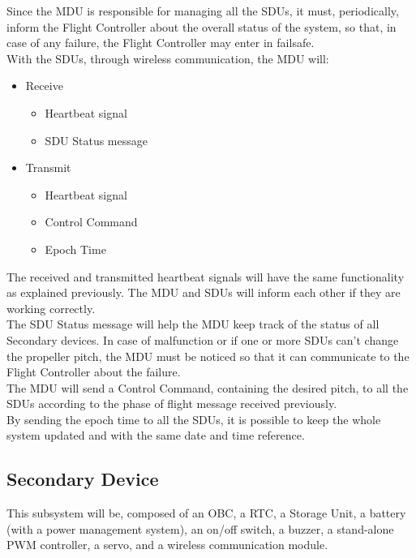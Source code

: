 Since the MDU is responsible for managing all the SDUs, it must, periodically, inform the Flight Controller about the overall status of the system, so that, in case of any failure, the Flight Controller may enter in failsafe.\\

With the SDUs, through wireless communication, the MDU will:
\begin{itemize}
    \item Receive
          \begin{itemize}
              \item Heartbeat signal
              \item SDU Status message
          \end{itemize}
    \item Transmit
          \begin{itemize}
              \item Heartbeat signal
              \item Control Command
              \item Epoch Time
          \end{itemize}
\end{itemize}

The received and transmitted heartbeat signals will have the same functionality as explained previously. The MDU and SDUs will inform each other if they are working correctly.\\

The SDU Status message will help the MDU keep track of the status of all Secondary devices. In case of malfunction or if one or more SDUs can't change the propeller pitch, the MDU must be noticed so that it can communicate to the Flight Controller about the failure.\\

The MDU will send a Control Command, containing the desired pitch, to all the SDUs according to the phase of flight message received previously.\\

By sending the epoch time to all the SDUs, it is possible to keep the whole system updated and with the same date and time reference.\\

\subsection{Secondary Device}
This subsystem will be, composed of an \gls{OBC}, a \gls{RTC}, a Storage Unit, a battery (with a power management system), an on/off switch, a buzzer, a stand-alone \gls{PWM} controller, a servo, and a wireless communication module.\\

